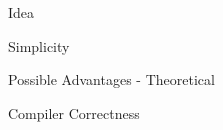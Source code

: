 \documentclass[notes, xcolor = dvipsnames]{beamer}
\begin{document}
    \begin{frame}{Idea}



    \end{frame}

    \begin{frame}{Simplicity}

             
    \end{frame}

    \begin{frame}{Possible Advantages - Theoretical}


    \end{frame}

    \begin{frame}{Compiler Correctness}
        

    \end{frame}
\end{document}
